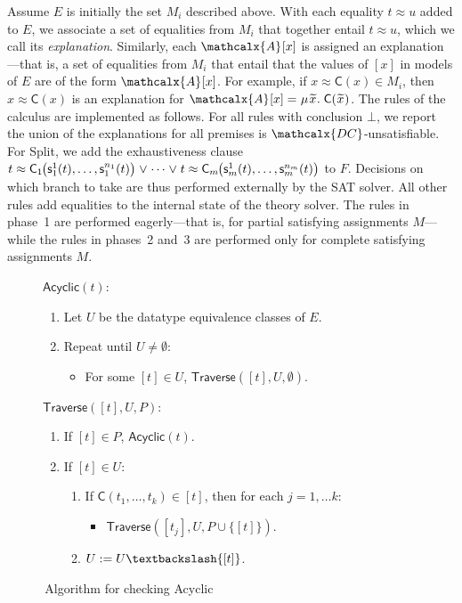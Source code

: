 \documentclass[smallcondensed,draft]{svjour3}
\newcommand\DISC[1]{t \teq \const{C}_{#1}\negvthinspace\bigl(\const s^1_{#1}( t ), \ldots,\const s^{n_{#1}}_{#1}( t )\bigr)}
\newcommand\MU{\vvthinspace\mu\vvthinspace}
\newcommand\const[1]{\textsf{#1}}
\newcommand{\Ec}{E}
\newcommand{\rn}[1]{\textsf{#1}}
\newcommand{\teq}{\approx}
\newcommand{\ec}[1]{[#1]}
\newcommand{\Val}{\mathcalx{A}\vvthinspace}
\newcommand{\Varec}[1]{\vvthinspace\widetilde{#1}\vvthinspace}
\newcommand{\thD}{\mathcalx{DC}}
\newcommand\vvthinspace{\kern+0.041667em}
\newcommand\negvthinspace{\kern-0.083333em}
\begin{document}
Assume $\Ec$ is initially the set $M_i$ described above. With each equality $t \teq u$ added
to $\Ec$, we associate a set of equalities from $M_i$ that together entail $t
\teq u$, which we call its \emph{explanation}.
Similarly, each $\Val \ec{x}$ is assigned an explanation---that is, a set
of equalities from $M_i$ that entail that the values of $\ec{x}$ in models of
$\Ec$ are of the form $\Val \ec{x}$. For example, if $x \teq \const{C}( x ) \in
M_i$, then $x \teq \const{C}( x )$ is an %
explanation for $\Val \ec{x} = \MU {\Varec{x}}.\; \const{C}( {\Varec{x}} )$.
The rules of the calculus are implemented as follows. For all rules with
conclusion $\bot$, we report the union of the explanations for all premises is
$\thD$-unsatisfiable. For \rn{Split}, we add the exhaustiveness clause %
$\DISC{1} \mathrel\lor \cdots \mathrel\lor \DISC{m}$ to $F$.
Decisions on which branch to take are thus performed externally by the SAT
solver. %
All other rules add equalities to the
internal state of the theory solver. The rules in phase~1 are performed
eagerly---that is, for partial satisfying assignments $M$---while the rules in
phases~2 and~3 are performed only for complete satisfying
assignments $M$.

\begin{figure}[t!]
\normalsize
\centering
\flushleft $\rn{Acyclic}(t)$:

\vspace*{-\topsep}

\begin{enumerate}
\item Let $U$ be the datatype equivalence classes of $\Ec$.
\item Repeat until $U \neq \emptyset$:
\begin{itemize}
\item[\ ] For some $\ec{t} \in U$, $\rn{Traverse}( \ec{t}, U, \emptyset )$.
\end{itemize}
\end{enumerate}

\flushleft $\rn{Traverse}( \ec{t}, U, P )$:

\vspace*{-\topsep}

\begin{enumerate}
\item If $\ec{t} \in P$, $\rn{Acyclic}(t)$.
\item If $\ec{t} \in U$:
\begin{enumerate}
\item[2.1.] If $\const{C}( t_1, \ldots, t_k ) \in \ec{t}$, then for each $j = 1, \ldots k$:
\begin{itemize}
\item[2.1.1.] $\rn{Traverse}( \ec{t_j}, U, P \cup \{ \ec{t} \} )$.
\end{itemize}
\item[2.2.] $U := U \textbackslash \{ \ec{t} \}$.
\end{enumerate}
\end{enumerate}
\vspace*{-\topsep}
\caption{\,Algorithm for checking \rn{Acyclic}}
\label{fig:acyclic-algo}
\end{figure}
\end{document}

